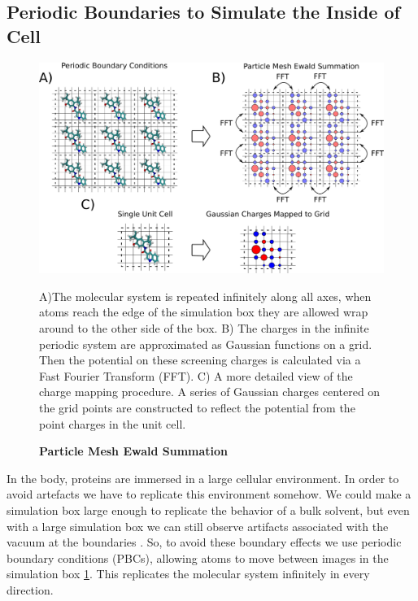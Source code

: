 \subsection{Periodic Boundaries to Simulate the Inside of Cell}
\begin{figure}
	\begin{center}
		\includegraphics[width=\textwidth]{figures/PME_miro.pdf}
	\end{center}
	\captionsetup{singlelinecheck = false, justification=raggedright}
	\caption[Particle Mesh Ewald Summation] {\textbf{Particle Mesh Ewald Summation}}{A)The molecular system is repeated infinitely along all axes, when atoms reach the edge of the simulation box they are allowed wrap around to the other side of the box. B) The charges in the infinite periodic system are approximated as Gaussian functions on a grid. Then the potential on these screening charges is calculated via a Fast Fourier Transform (FFT). C) A more detailed view of the charge mapping procedure. A series of Gaussian charges centered on the grid points are constructed to reflect the potential from the point charges in the unit cell. }
	\label{PME_illustration}
\end{figure}

In the body, proteins are immersed in a large cellular environment. In order to avoid artefacts we have to replicate this environment somehow. We could make a simulation box large enough to replicate the behavior of a bulk solvent, but even with a large simulation box we can still observe artifacts associated with the vacuum at the boundaries \cite{gapsys2020}. So, to avoid these boundary effects we use periodic boundary conditions (PBCs), allowing atoms to move between images in the simulation box \ref{PME_illustration}. This replicates the molecular system infinitely in every direction. 

